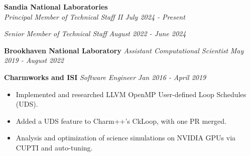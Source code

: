 \newcommand{\myExpFour}{
\item Implemented and researched LLVM OpenMP User-defined Loop Schedules (UDS). 
\item Added a UDS feature to Charm++'s CkLoop, with one PR merged. 
\item Analysis and optimization of science simulations on NVIDIA GPUs via CUPTI and auto-tuning.  
}

\textbf{Sandia National Laboratories}\\
\textit{Principal Member of Technical Staff II} \hfill \textit{July 2024 - Present}
\noindent
\begin{itemize}\onlyitems[include={1,2}]
\myExpOne
\end{itemize}

\noindent
\textit{Senior Member of Technical Staff} \hfill \textit{August 2022 - June 2024}
\begin{itemize}
\myExpTwo 
\end{itemize} 
\textbf{Brookhaven National Laboratory}\hfill
\textit{Assistant Computational Scientist} \hfill \textit{May 2019 - August 2022}
\begin{itemize}
\myExpThree
\end{itemize}

\noindent
\textbf{Charmworks and ISI}\hfill
\textit{Software Engineer} \hfill \textit{Jan 2016 - April 2019}
\vspace{-0.02in}
\begin{itemize}
\myExpFour
\end{itemize}
\noindent

